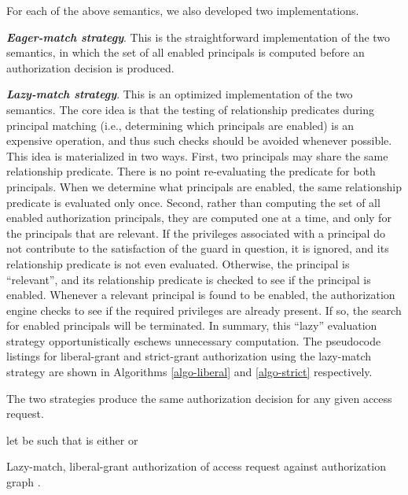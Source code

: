 \documentclass{acm_proc_article-sp}
\newcommand{\Dfn}[1]{\textbf{\emph{#1}}}
\begin{document}
For each of the above semantics, we also developed two
implementations.
\begin{compactenum}
\item \Dfn{Eager-match strategy}.  This is the straightforward
  implementation of the two semantics, in which the set of all enabled
  principals is computed before an authorization decision is produced.
\item \Dfn{Lazy-match strategy}.  This is an optimized implementation
  of the two semantics.  The core idea is that the testing of
  relationship predicates during principal matching (i.e., determining
  which principals are enabled) is an expensive operation, and thus
  such checks should be avoided whenever possible.  This idea is
  materialized in two ways.  First, two principals may share the same
  relationship predicate.  There is no point re-evaluating the
  predicate for both principals. When we determine what principals are
  enabled, the same relationship predicate is evaluated only once.
  Second, rather than computing the set of all enabled authorization
  principals, they are computed one at a time, and only for the
  principals that are relevant.  If the privileges associated with a
  principal do not contribute to the satisfaction of the guard in
  question, it is ignored, and its relationship predicate is not even
  evaluated.  Otherwise, the principal is ``relevant'', and its
  relationship predicate is checked to see if the principal is
  enabled.  Whenever a relevant principal is found to be enabled, the
  authorization engine checks to see if the required privileges are
  already present.  If so, the search for enabled principals will be
  terminated.  In summary, this ``lazy'' evaluation strategy
  opportunistically eschews unnecessary computation.  The pseudocode
  listings for liberal-grant and strict-grant authorization using the
  lazy-match strategy are shown in Algorithms \ref{algo-liberal} and
  \ref{algo-strict} respectively.
\end{compactenum}
The two strategies produce the same authorization decision for any
given access request.



\begin{algorithm}[t]
let  be such that  is either 
  or \;
\;
\;
\caption{Lazy-match, liberal-grant authorization of access request
   against authorization graph .\label{algo-liberal}}
\end{algorithm}
\end{document}
